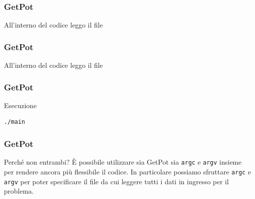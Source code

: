 \documentclass{beamer}
\begin{document}

\begin{frame}[fragile]

    \frametitle{GetPot}

    \begin{block}{All'interno del codice leggo il file}
        \lstset{basicstyle=\scriptsize\sf}
            
        \lstset{basicstyle=\sf}
    \end{block}

\end{frame}


\begin{frame}[fragile]

    \frametitle{GetPot}

    \begin{block}{All'interno del codice leggo il file}
        \lstset{basicstyle=\scriptsize\sf}
            
        \lstset{basicstyle=\sf}
    \end{block}

\end{frame}


\begin{frame}[fragile]

    \frametitle{GetPot}

        \begin{block}{Esecuzione}
            \begin{verbatim}
./main
            \end{verbatim}
        \end{block}

\end{frame}



\begin{frame}[fragile]

    \frametitle{GetPot}

    \begin{block}{Perch\'e non entrambi?}
        \`E possibile utilizzare sia GetPot sia \texttt{argc} e
        \texttt{argv} insieme per rendere ancora pi\`u flessibile il codice.
        In particolare possiamo sfruttare \texttt{argc} e \texttt{argv} per
        poter specificare il file da cui leggere tutti i dati in ingresso per il problema.
    \end{block}

\end{frame}
\end{document}

